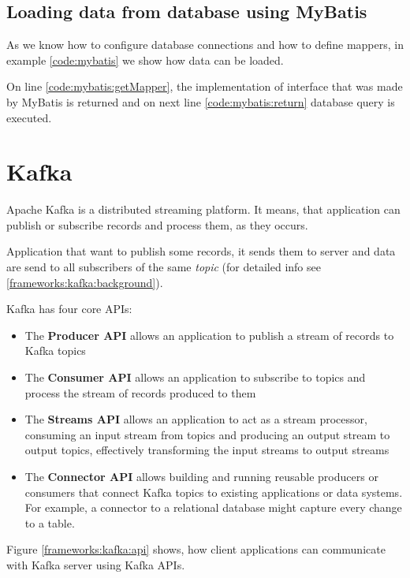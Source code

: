 \subsection{Loading data from database using MyBatis \label{mybatis:run}}

As we know how to configure database connections and how to define mappers,
in example \ref{code:mybatis} we show how data can be loaded.

On line \ref{code:mybatis:getMapper}, the implementation of  interface
that was made by MyBatis is returned and on next line \ref{code:mybatis:return} database query is executed.




\section{Kafka}

Apache Kafka \citet{Kafka} is a distributed streaming platform.
It means, that application can publish or subscribe records and
process them, as they occurs.

Application that want to publish some records, it sends them to server
and data are send to all subscribers of the same \textit{topic}
(for detailed info see \ref{frameworks:kafka:background}).

Kafka has four core APIs:
\begin{itemize}
  \item The \textbf{Producer API} allows an application to publish
    a stream of records to Kafka topics
  \item The \textbf{Consumer API} allows an application to subscribe
    to topics and process the stream of records produced to them
  \item The \textbf{Streams API} allows an application to act as a stream processor,
    consuming an input stream from topics and producing an output stream to output topics,
    effectively transforming the input streams to output streams
  \item The \textbf{Connector API} allows building and running reusable producers or consumers
    that connect Kafka topics to existing applications or data systems.
    For example, a connector to a relational database might capture every change to a table. 
\end{itemize}

Figure \ref{frameworks:kafka:api} shows, how client applications can communicate with Kafka server
using Kafka APIs.

